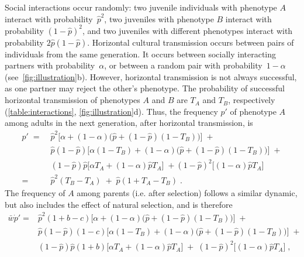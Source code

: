 \documentclass[12pt]{extarticle}
\begin{document}
Social interactions occur randomly:
two juvenile individuals with phenotype $A$ interact with probability~$\hat{p}^2$, two juveniles with phenotype $B$ interact with probability $(1-\hat{p})^2$, and two juveniles with different phenotypes interact with probability $2\hat{p}(1-\hat{p})$. 
Horizontal cultural transmission occurs between pairs of individuals from the same generation. 
It occurs between socially interacting partners with probability~$\alpha$, or between a random pair with probability~$1-\alpha$ (see~\autoref{fig:illustration}b).
However, horizontal transmission is not always successful, as one partner may reject the other's phenotype.
The probability of successful horizontal transmission of phenotypes $A$ and $B$ are $T_A$ and $T_B$, respectively (\autoref{table:interactions}, \autoref{fig:illustration}d).
Thus, the frequency $p'$ of phenotype $A$ among adults in the next generation, after horizontal transmission, is 
\begin{equation}\label{eq:nextgen_adults}
\begin{aligned}
p' \;= \;
& \hat{p}^2 \big[\alpha + (1-\alpha)\big(\hat{p} + (1-\hat{p})(1-T_B)\big)\big] \;+ \\
& \hat{p}(1-\hat{p}) \big[\alpha(1-T_B) + (1-\alpha)\big(\hat{p} + (1-\hat{p})(1-T_B)\big)\big] \;+ \\
& (1-\hat{p})\hat{p} \big[\alpha T_A + (1-\alpha) \hat{p} T_A \big] \;+ 
(1-\hat{p})^2 \big[(1-\alpha) \hat{p} T_A \big] \\
=\; & \hat{p}^2(T_B-T_A) \;+\; \hat{p}(1+T_A-T_B) \;.
\end{aligned}
\end{equation}
The frequency of $A$ among parents (i.e. after selection) follows a similar dynamic, but also includes the effect of natural selection, and is therefore
\begin{equation}\label{eq:nextgen_parents}
\begin{aligned}
\bar{w} \dot{p}' =
& \hat{p}^2 (1+b-c) \big[\alpha + (1-\alpha)\big(\hat{p} + (1-\hat{p})(1-T_B)\big)\big] \;+ \\
& \hat{p}(1-\hat{p}) (1-c) \big[\alpha(1-T_B) + (1-\alpha)\big(\hat{p} + (1-\hat{p})(1-T_B)\big)\big] \;+ \\
& (1-\hat{p})\hat{p} (1+b) \big[\alpha T_A + (1-\alpha) \hat{p} T_A \big] \;+\; 
(1-\hat{p})^2 \big[(1-\alpha) \hat{p} T_A \big] \;,
\end{aligned}
\end{equation}
\end{document}
